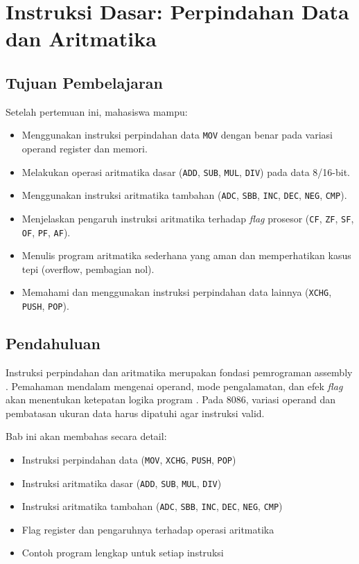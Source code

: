 \documentclass[../main.tex]{subfiles}
\begin{document}
\chapter{Instruksi Dasar: Perpindahan Data dan Aritmatika}

    \section{Tujuan Pembelajaran}
        Setelah pertemuan ini, mahasiswa mampu:
        \begin{itemize}
            \item Menggunakan instruksi perpindahan data \texttt{MOV} dengan benar pada variasi operand register dan memori.
            \item Melakukan operasi aritmatika dasar (\texttt{ADD}, \texttt{SUB}, \texttt{MUL}, \texttt{DIV}) pada data 8/16-bit.
            \item Menggunakan instruksi aritmatika tambahan (\texttt{ADC}, \texttt{SBB}, \texttt{INC}, \texttt{DEC}, \texttt{NEG}, \texttt{CMP}).
            \item Menjelaskan pengaruh instruksi aritmatika terhadap \textit{flag} prosesor (\texttt{CF}, \texttt{ZF}, \texttt{SF}, \texttt{OF}, \texttt{PF}, \texttt{AF}).
            \item Menulis program aritmatika sederhana yang aman dan memperhatikan kasus tepi (overflow, pembagian nol).
            \item Memahami dan menggunakan instruksi perpindahan data lainnya (\texttt{XCHG}, \texttt{PUSH}, \texttt{POP}).
        \end{itemize}

    \section{Pendahuluan}
        Instruksi perpindahan dan aritmatika merupakan fondasi pemrograman assembly \cite{8086_instruction_set_reference}. Pemahaman mendalam mengenai operand, mode pengalamatan, dan efek \textit{flag} akan menentukan ketepatan logika program \cite{tutorials_point_assembly}. Pada 8086, variasi operand dan pembatasan ukuran data harus dipatuhi agar instruksi valid.

        Bab ini akan membahas secara detail:
        \begin{itemize}
            \item Instruksi perpindahan data (\texttt{MOV}, \texttt{XCHG}, \texttt{PUSH}, \texttt{POP})
            \item Instruksi aritmatika dasar (\texttt{ADD}, \texttt{SUB}, \texttt{MUL}, \texttt{DIV})
            \item Instruksi aritmatika tambahan (\texttt{ADC}, \texttt{SBB}, \texttt{INC}, \texttt{DEC}, \texttt{NEG}, \texttt{CMP})
            \item Flag register dan pengaruhnya terhadap operasi aritmatika
            \item Contoh program lengkap untuk setiap instruksi
        \end{itemize}
\end{document}
